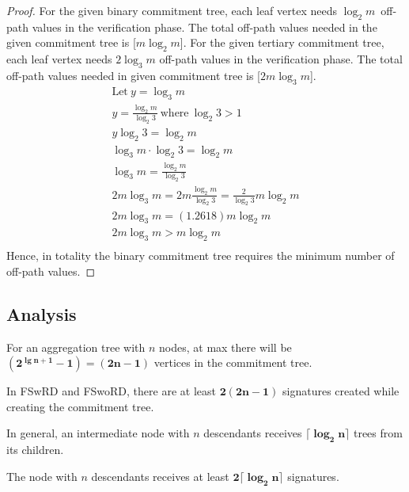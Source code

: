 \documentclass[%
  slidesonly,%
  semlayer%
  ]{seminar}                                  %
\begin{document}
\begin{slide}
\begin{proof}
          For the given binary commitment tree, each leaf vertex needs $\log_2 m$\ off-path values in the verification phase.
          The total off-path values needed in the given commitment tree is [${m \log_2 m}$].
          For the given tertiary commitment tree, each leaf vertex needs $2 \log_3 m$ off-path values in the verification phase.
          The total off-path values needed in given commitment tree is [$2 m \log_3 m$].
            \begin{equation*}
              \begin{array}{l}
                \mbox{Let}\  y = \log_3 m\\
                y = \frac{ {\log _2 m } }{{\log _2  3 }}\ \mbox{where}\ \log_2 3 > 1\\
                y \log_2 3 = \log _2 m \\
                \log_3 m \cdot \log_2 3 = \log _2 m \\
                \log_3 m = \frac{ {\log _2 m } }{{\log _2  3 }} \\
                2m\log_3 m = 2m\frac{ {\log _2 m } }{{\log _2  3 }} = \frac{ {2 } } {{\log _2  3 }}m\log _2 m \\
                2m\log_3 m = (1.2618)m\log _2 m \\
                2m\log_3 m > m\log _2 m \\

              \end{array}
            \end{equation*}
          Hence, in totality the binary commitment tree requires the minimum number of off-path values.
        \end{proof}        
        \vfill
        \clearpage

      \subsection*{Analysis}
        \vfill
        For an aggregation tree with $n$ nodes, at max there will be $\mathbf{(2^{\lg n + 1} - 1) = (2n-1)}$ vertices in the commitment tree.

        In FSwRD and FSwoRD, there are at least $\mathbf{2(2n-1)}$ signatures created while creating the commitment tree.

        In general, an intermediate node with $n$ descendants receives $\mathbf{\lceil \log_2 n \rceil}$ trees from its children.
        
        The node with $n$ descendants receives at least $\mathbf{2 \lceil \log_2 n \rceil} $ signatures.


\end{slide}
\end{document}
